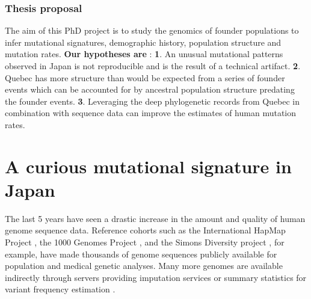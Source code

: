 \documentclass[
11pt, %
oneside, %
english, %
doublespacing, %
headsepline, %
]{MastersDoctoralThesis} %
\begin{document}
\subsection{Thesis proposal}

The aim of this PhD project is to study the genomics of founder populations to infer mutational signatures, demographic history, population structure and mutation rates.
\textbf{Our hypotheses are }: \textbf{1}. An unusual mutational patterns observed in Japan is not reproducible and is the result of a technical artifact.
\textbf{2}. Quebec has more structure than would be expected from a series of founder events which can be accounted for by ancestral population structure predating the founder events.
\textbf{3}. Leveraging the deep phylogenetic records from Quebec in combination with sequence data can improve the estimates of human mutation rates.


\chapter{A curious mutational signature in Japan}

The last 5 years have seen a drastic increase in the amount and quality of human genome sequence data. 
Reference cohorts such as the International HapMap Project \citep{HapMap2005}, the 1000 Genomes Project \citep{1000GenomesProjectConsortium2010,The1000GenomesProjectConsortium2012}, and the Simons Diversity project \citep{Mallick2016}, for example, have made thousands of genome sequences publicly available for population and medical genetic analyses. 
Many more genomes are available indirectly through servers providing imputation services \citep{HapMap2005} or summary statistics for variant frequency estimation \citep{Lek2016}.
\end{document}
